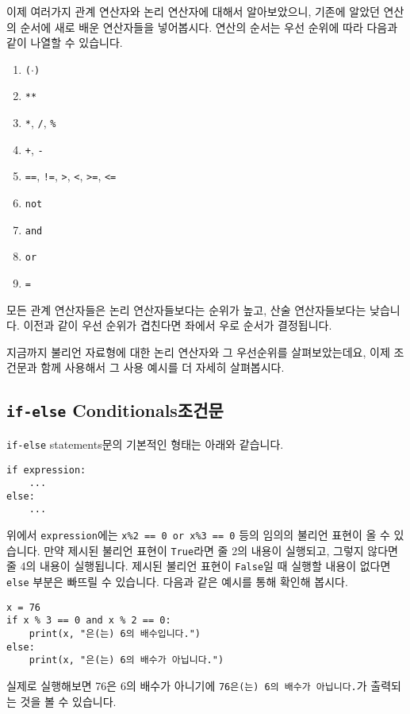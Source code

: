 \documentclass[../main.tex]{subfiles}
\begin{document}
이제 여러가지 관계 연산자와 논리 연산자에 대해서 알아보았으니, 기존에 알았던 연산의 순서에 새로 배운 연산자들을 넣어봅시다.
연산의 순서는 우선 순위에 따라 다음과 같이 나열할 수 있습니다.
\begin{enumerate}
  \item \texttt{($\cdot$)}
  \item \texttt{\texttt{**}}
  \item \texttt{*}, \texttt{/}, \texttt{\%}
  \item \texttt{+}, \texttt{-}
  \item \texttt{==}, \texttt{!=}, \texttt{>}, \texttt{<}, \texttt{>=}, \texttt{<=}
  \item \texttt{not}
  \item \texttt{and}
  \item \texttt{or}
  \item \texttt{=}
\end{enumerate}
모든 관계 연산자들은 논리 연산자들보다는 순위가 높고, 산술 연산자들보다는 낮습니다.
이전과 같이 우선 순위가 겹친다면 좌에서 우로 순서가 결정됩니다.

지금까지 불리언 자료형에 대한 논리 연산자와 그 우선순위를 살펴보았는데요, 이제
조건문과 함께 사용해서 그 사용 예시를 더 자세히 살펴봅시다.

\subsection{\texttt{if-else} Conditionals조건문}
\texttt{if-else} statements문의 기본적인 형태는 아래와 같습니다.
\begin{verbatim}
if expression:
    ...
else:
    ...
\end{verbatim}
위에서 \texttt{expression}에는 \texttt{x\%2 == 0 or x\%3 == 0} 등의 임의의
불리언 표현이 올 수 있습니다.  만약 제시된 불리언 표현이 \texttt{True}라면 줄
2의 내용이 실행되고, 그렇지 않다면 줄 4의 내용이 실행됩니다.  제시된 불리언
표현이 \texttt{False}일 때 실행할 내용이 없다면 \texttt{else} 부분은 빠뜨릴 수
있습니다.
다음과 같은 예시를 통해 확인해 봅시다.
\begin{verbatim}
x = 76
if x % 3 == 0 and x % 2 == 0:
    print(x, "은(는) 6의 배수입니다.")
else:
    print(x, "은(는) 6의 배수가 아닙니다.")
\end{verbatim}
실제로 실행해보면 76은 6의 배수가 아니기에 \texttt{76은(는) 6의 배수가
아닙니다.}가 출력되는 것을 볼 수 있습니다.
\end{document}
